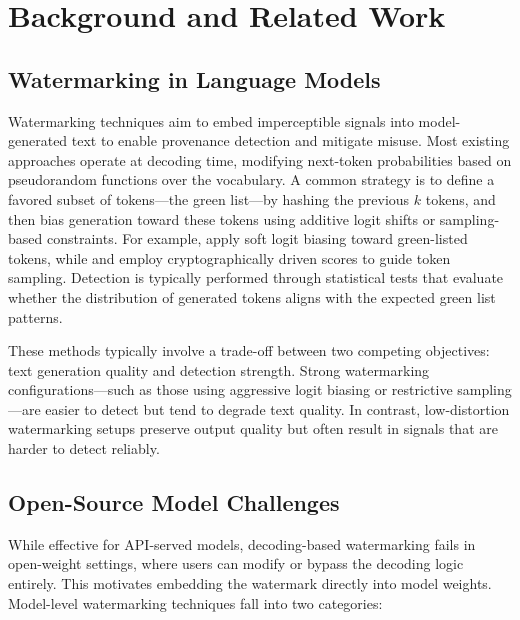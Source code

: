 \section{Background and Related Work}
\label{sec:background_related}

\subsection{Watermarking in Language Models}

Watermarking techniques aim to embed imperceptible signals into model-generated text to enable provenance detection and mitigate misuse. Most existing approaches operate at decoding time, modifying next-token probabilities based on pseudorandom functions over the vocabulary. A common strategy is to define a favored subset of tokens—the green list—by hashing the previous \(k\) tokens, and then bias generation toward these tokens using additive logit shifts or sampling-based constraints. For example, \citet{kirchenbauer2023watermark} apply soft logit biasing toward green-listed tokens, while \citet{aaronson2023reform} and \citet{kuditipudi2023robust} employ cryptographically driven scores to guide token sampling. Detection is typically performed through statistical tests that evaluate whether the distribution of generated tokens aligns with the expected green list patterns.

These methods typically involve a trade-off between two competing objectives: text generation quality and detection strength. Strong watermarking configurations—such as those using aggressive logit biasing or restrictive sampling—are easier to detect but tend to degrade text quality. In contrast, low-distortion watermarking setups preserve output quality but often result in signals that are harder to detect reliably.

\subsection{Open-Source Model Challenges}

While effective for API-served models, decoding-based watermarking fails in open-weight settings, where users can modify or bypass the decoding logic entirely. This motivates embedding the watermark directly into model weights. Model-level watermarking techniques fall into two categories:

